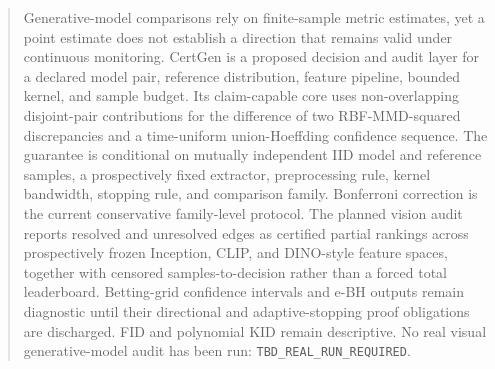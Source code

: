 \begin{abstract}
Generative-model comparisons rely on finite-sample metric estimates, yet a point
estimate does not establish a direction that remains valid under continuous
monitoring. CertGen is a proposed decision and audit layer for a declared model
pair, reference distribution, feature pipeline, bounded kernel, and sample
budget. Its claim-capable core uses non-overlapping disjoint-pair contributions
for the difference of two RBF-MMD-squared discrepancies and a time-uniform
union-Hoeffding confidence sequence. The guarantee is conditional on mutually
independent IID model and reference samples, a prospectively fixed extractor,
preprocessing rule, kernel bandwidth, stopping rule, and comparison family.
Bonferroni correction is the current conservative family-level protocol.
The planned vision audit reports resolved and unresolved edges as certified
partial rankings across prospectively frozen Inception, CLIP, and DINO-style
feature spaces, together with censored samples-to-decision rather than a forced
total leaderboard.
Betting-grid confidence intervals and e-BH outputs remain diagnostic until their
directional and adaptive-stopping proof obligations are discharged. FID and
polynomial KID remain descriptive. No real visual generative-model audit has been run:
\texttt{TBD\_REAL\_RUN\_REQUIRED}.
\end{abstract}

